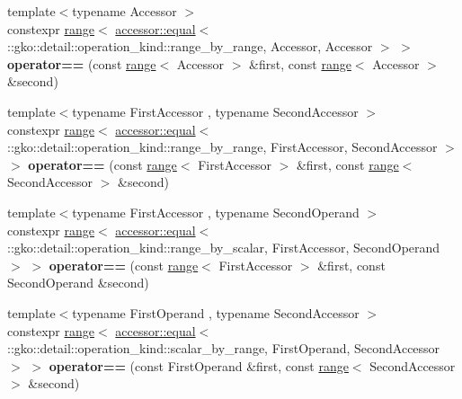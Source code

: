 \begin{DoxyCompactItemize}
\item 
\mbox{\label{namespacegko_a9b12398fc180e82bf31cd7aa210ba731}} 
{\footnotesize template$<$typename Accessor $>$ }\\constexpr \hyperlink{classgko_1_1range}{range}$<$ \hyperlink{structgko_1_1accessor_1_1equal}{accessor\+::equal}$<$ \+::gko\+::detail\+::operation\+\_\+kind\+::range\+\_\+by\+\_\+range, Accessor, Accessor $>$ $>$ {\bfseries operator==} (const \hyperlink{classgko_1_1range}{range}$<$ Accessor $>$ \&first, const \hyperlink{classgko_1_1range}{range}$<$ Accessor $>$ \&second)
\item 
\mbox{\label{namespacegko_a754f3a148a6ffbd2ebc1de4950f874d3}} 
{\footnotesize template$<$typename First\+Accessor , typename Second\+Accessor $>$ }\\constexpr \hyperlink{classgko_1_1range}{range}$<$ \hyperlink{structgko_1_1accessor_1_1equal}{accessor\+::equal}$<$ \+::gko\+::detail\+::operation\+\_\+kind\+::range\+\_\+by\+\_\+range, First\+Accessor, Second\+Accessor $>$ $>$ {\bfseries operator==} (const \hyperlink{classgko_1_1range}{range}$<$ First\+Accessor $>$ \&first, const \hyperlink{classgko_1_1range}{range}$<$ Second\+Accessor $>$ \&second)
\item 
\mbox{\label{namespacegko_ae093d67dc43ee09722642623abfef970}} 
{\footnotesize template$<$typename First\+Accessor , typename Second\+Operand $>$ }\\constexpr \hyperlink{classgko_1_1range}{range}$<$ \hyperlink{structgko_1_1accessor_1_1equal}{accessor\+::equal}$<$ \+::gko\+::detail\+::operation\+\_\+kind\+::range\+\_\+by\+\_\+scalar, First\+Accessor, Second\+Operand $>$ $>$ {\bfseries operator==} (const \hyperlink{classgko_1_1range}{range}$<$ First\+Accessor $>$ \&first, const Second\+Operand \&second)
\item 
\mbox{\label{namespacegko_a045f895f0a9784b07f8df78507b278ac}} 
{\footnotesize template$<$typename First\+Operand , typename Second\+Accessor $>$ }\\constexpr \hyperlink{classgko_1_1range}{range}$<$ \hyperlink{structgko_1_1accessor_1_1equal}{accessor\+::equal}$<$ \+::gko\+::detail\+::operation\+\_\+kind\+::scalar\+\_\+by\+\_\+range, First\+Operand, Second\+Accessor $>$ $>$ {\bfseries operator==} (const First\+Operand \&first, const \hyperlink{classgko_1_1range}{range}$<$ Second\+Accessor $>$ \&second)

\end{DoxyCompactItemize}
